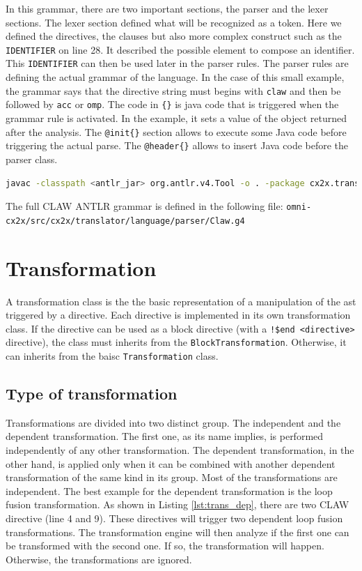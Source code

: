 \documentclass[a4paper, 11pt]{report}
\begin{document}
In this grammar, there are two important sections, the parser and the lexer sections. The lexer section defined what will be recognized as a token. Here we defined the directives, the clauses but also more complex construct such as the \lstinline|IDENTIFIER| on line 28. It described the possible element to compose an identifier. This \lstinline|IDENTIFIER| can then be used later in the parser rules. 
The parser rules are defining the actual grammar of the language. In the case of this small example, the grammar says that the directive string must begins with \lstinline|claw| and then be followed by \lstinline|acc| or \lstinline|omp|. The code in \lstinline|{}| is java code that is triggered when the grammar rule is activated. In the example, it sets a value of the object returned after the analysis.
The \lstinline|@init{}| section allows to execute some Java code before triggering the actual parse. The \lstinline|@header{}| allows to insert Java code before the parser class.

\begin{lstlisting}[label=lst:antlr_cmd, caption=ANTLR parser generation command, language=bash]
javac -classpath <antlr_jar> org.antlr.v4.Tool -o . -package cx2x.translator.language.parser Claw.g4
\end{lstlisting}

The full CLAW ANTLR grammar is defined in the following file: \lstinline|omni-cx2x/src/cx2x/translator/language/parser/Claw.g4|

\chapter{Transformation}
\label{chapter:transformation}
A transformation class is the the basic representation of a manipulation of the \gls{ast} triggered by a directive. Each directive is implemented in its own transformation class. If the directive can be used as a block directive (with a \lstinline|!$end <directive>| directive), the class must inherits from the \lstinline!BlockTransformation!. Otherwise, it can inherits from the baisc \lstinline!Transformation! class.

\section{Type of transformation}
Transformations are divided into two distinct group. The independent and the dependent transformation. The first one, as its name implies, is performed independently of any other transformation. The dependent transformation, in the other hand, is applied only when it can be combined with another dependent transformation of the same kind in its group. Most of the transformations are independent. The best example for the dependent transformation is the loop fusion transformation. As shown in Listing \ref{lst:trans_dep}, there are two CLAW directive (line 4 and 9). These directives will trigger two dependent loop fusion transformations. The transformation engine will then analyze if the first one can be transformed with the second one. If so, the transformation will happen. Otherwise, the transformations are ignored.
\end{document}
